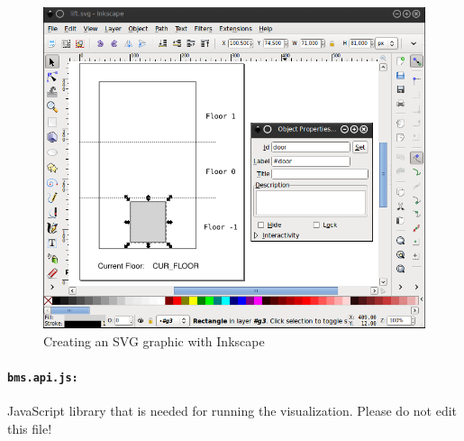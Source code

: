 \begin{figure}[!ht]
\begin{center}
	\includegraphics[width=12cm]{img/tutorial/tut_02.png}
	\caption{Creating an SVG graphic with Inkscape}
	\label{fig_tut_02_inkscape}
\end{center}
\end{figure} 

\paragraph{\texttt{bms.api.js:}}
JavaScript library that is needed for running the visualization.
Please do not edit this file!

%

